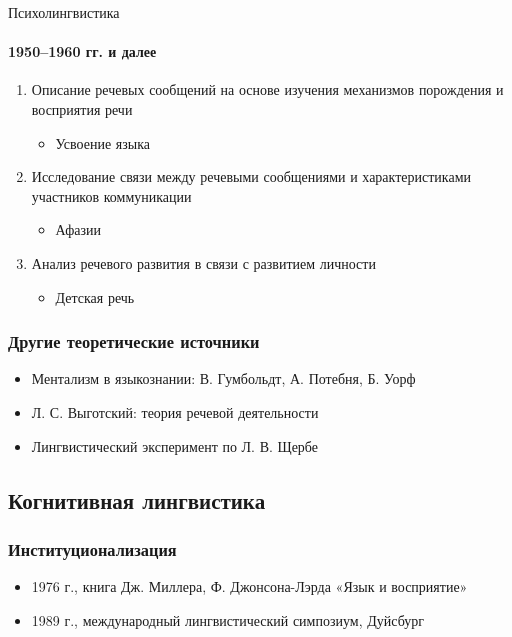 \begin{frame}{Психолингвистика}
  \framesubtitle{1950--1960 гг. и далее}

  \begin{enumerate}
    \item Описание речевых сообщений на основе изучения механизмов порождения и восприятия речи \begin{itemize}
      \item Усвоение языка
    \end{itemize}
    \item Исследование связи между речевыми сообщениями и характеристиками участников коммуникации \begin{itemize}
      \item Афазии
    \end{itemize}
    \item Анализ речевого развития в связи с развитием личности \begin{itemize}
      \item Детская речь
    \end{itemize}
  \end{enumerate}
\end{frame}

\begin{frame}
  \frametitle{Другие теоретические источники}

  \begin{itemize}
    \item Ментализм в языкознании: В. Гумбольдт, А. Потебня, Б. Уорф
    \item Л. С. Выготский: теория речевой деятельности
    \item Лингвистический эксперимент по Л. В. Щербе
  \end{itemize}
\end{frame}

\subsection{Когнитивная лингвистика}

\begin{frame}
  \frametitle{Институционализация}

  \begin{itemize}
    \item 1976 г., книга Дж. Миллера, Ф. Джонсона-Лэрда «Язык и восприятие»
    \item 1989 г., международный лингвистический симпозиум, Дуйсбург
  \end{itemize}
\end{frame}

